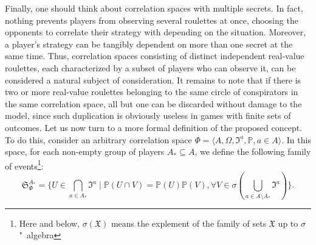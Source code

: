 Finally, one should think about correlation spaces with multiple secrets. In fact, nothing prevents players from observing several roulettes at once, choosing the opponents to correlate their strategy with depending on the situation. Moreover, a player's strategy can be tangibly dependent on more than one secret at the same time. Thus, correlation spaces consisting of distinct independent real-value roulettes, each characterized by a subset of players who can observe it, can be considered a natural subject of consideration. It remains to note that if there is two or more real-value roulettes belonging to the same circle of conspirators in the same correlation space, all but one can be discarded without damage to the model, since such duplication is obviously useless in games with finite sets of outcomes. Let us now turn to a more formal definition of the proposed concept. To do this, consider an arbitrary correlation space $\Phi = \langle A, \Omega, \mathfrak{I}^a, \mathbb{P}, a \in A \rangle$. In this space, for each non-empty group of players $A_* \subseteq A$, we define the following family of events\footnote{Here and below, $\sigma(\mathfrak{X})$ means the explement of the family of sets $\mathfrak{X}$ up to $\sigma$"~algebra}: %
\begin{equation*}
	\mathfrak{S}_\Phi^{A_*} = \{U \in \bigcap\limits_{a \in A_*} \mathfrak{I}^a \mid \mathbb{P}(U \cap V) = \mathbb{P}(U) \mathbb{P}(V), \forall V \in \sigma(\bigcup\limits_{a \in A \setminus A_*} \mathfrak{I}^a)\}.
\end{equation*}

